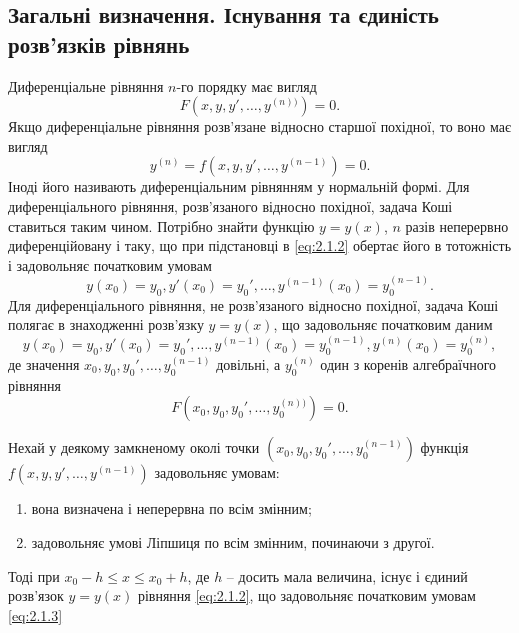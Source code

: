\subsection{Загальні визначення. Існування та єдиність роз\-в’я\-з\-ків рівнянь}

Диференціальне рівняння $n$-го порядку має вигляд
\begin{equation}
	\label{eq:2.1.1}
	F \left( x, y, y', \ldots, y^{(n))} \right) = 0.
\end{equation}
Якщо диференціальне рівняння розв’язане відносно старшої похідної, то воно має вигляд
\begin{equation}
	\label{eq:2.1.2}
	y^{(n)} = f \left( x, y, y', \ldots, y^{(n-1)} \right) = 0.
\end{equation}
Іноді його називають диференціальним рівнянням у нормальній формі. Для диференціального рівняння, розв’язаного відносно похідної, задача Коші ставиться таким чином. Потрібно знайти функцію $y = y(x)$, $n$ разів неперервно диференційовану і таку, що при підстановці в \eqref{eq:2.1.2} обертає його в тотожність і задовольняє початковим умовам 
\begin{equation}
	\label{eq:2.1.3}
	y(x_0) = y_0, y'(x_0) = y_0', \ldots, y^{(n - 1)} (x_0) = y_0^{(n-1)}.
\end{equation}
Для диференціального рівняння, не розв’язаного відносно похідної, задача Коші полягає в знаходженні розв’язку $y = y(x)$, що задовольняє початковим даним 
\begin{equation}
	\label{eq:2.1.4}
	y(x_0) = y_0, y'(x_0) = y_0', \ldots, y^{(n - 1)} (x_0) = y_0^{(n-1)}, y^{(n)} (x_0) = y_0^{(n)},
\end{equation}
де значення $x_0, y_0, y_0', \ldots, y_0^{(n-1)}$ довільні, а $y_0^{(n)}$ один з коренів алгебраїчного рівняння 
\begin{equation}
	\label{eq:2.1.5}
	F \left( x_0, y_0, y_0', \ldots, y_0^{(n))} \right) = 0.
\end{equation}

\begin{theorem}
	Нехай у деякому замкненому околі точки $\left(x_0, y_0, y_0', \ldots, y_0^{(n-1)}\right)$ функція $f\left(x,y,y',\ldots,y^{(n-1)}\right)$ задовольняє умовам:
	\begin{enumerate}
		\item вона визначена і неперервна по всім змінним;
		\item задовольняє умові Ліпшиця по всім змінним, починаючи з другої.
	\end{enumerate}
	Тоді при $x_0 - h \le x \le x_0 + h$, де $h$ -- досить мала величина, існує і єдиний розв’язок $y=y(x)$ рівняння \eqref{eq:2.1.2}, що задовольняє початковим умовам \eqref{eq:2.1.3}
\end{theorem}
  
